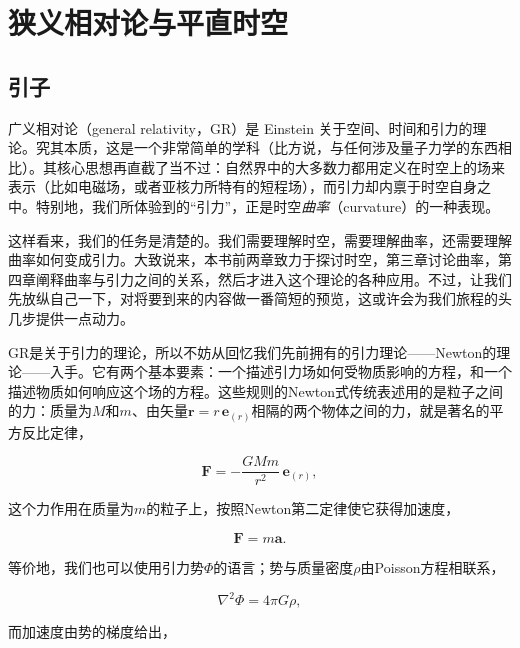 
\chapter{狭义相对论与平直时空}

\section{引子}

广义相对论（general relativity，GR）是 Einstein 关于空间、时间和引力的理论。究其本质，这是一个非常简单的学科（比方说，与任何涉及量子力学的东西相比）。其核心思想再直截了当不过：自然界中的大多数力都用定义在时空上的场来表示（比如电磁场，或者亚核力所特有的短程场），而引力却内禀于时空自身之中。特别地，我们所体验到的“引力”，正是时空\emph{曲率}（curvature）的一种表现。

这样看来，我们的任务是清楚的。我们需要理解时空，需要理解曲率，还需要理解曲率如何变成引力。大致说来，本书前两章致力于探讨时空，第三章讨论曲率，第四章阐释曲率与引力之间的关系，然后才进入这个理论的各种应用。不过，让我们先放纵自己一下，对将要到来的内容做一番简短的预览，这或许会为我们旅程的头几步提供一点动力。

GR是关于引力的理论，所以不妨从回忆我们先前拥有的引力理论——Newton的理论——入手。它有两个基本要素：一个描述引力场如何受物质影响的方程，和一个描述物质如何响应这个场的方程。这些规则的Newton式传统表述用的是粒子之间的力：质量为$M$和$m$、由矢量$\mathbf{r}=r\,\mathbf{e}_{(r)}$相隔的两个物体之间的力，就是著名的平方反比定律，

\begin{equation*}
\mathbf{F} = -\frac{GMm}{r^2}\,\mathbf{e}_{(r)},
\tag{1.1}
\end{equation*}

这个力作用在质量为$m$的粒子上，按照Newton第二定律使它获得加速度，

\begin{equation*}
\mathbf{F} = m\mathbf{a}.
\tag{1.2}
\end{equation*}

等价地，我们也可以使用引力势$\Phi$的语言；势与质量密度$\rho$由Poisson方程相联系，

\begin{equation*}
\nabla^2\Phi = 4\pi G\rho,
\tag{1.3}
\end{equation*}

而加速度由势的梯度给出，


